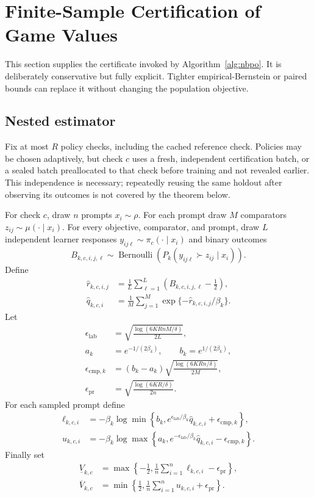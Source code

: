 \documentclass{article}
\theoremstyle{remark}
\theoremstyle{plain}
\begin{document}
\section{Finite-Sample Certification of Game Values}
\label{app:certificate}
This section supplies the certificate invoked by Algorithm~\ref{alg:nbpo}. It is deliberately conservative but fully explicit. Tighter empirical-Bernstein or paired bounds can replace it without changing the population objective.

\subsection{Nested estimator}
Fix at most $R$ policy checks, including the cached reference check. Policies may be chosen adaptively, but check $c$ uses a fresh, independent certification batch, or a sealed batch preallocated to that check before training and not revealed earlier. This independence is necessary; repeatedly reusing the same holdout after observing its outcomes is not covered by the theorem below.

For check $c$, draw $n$ prompts $x_i\sim\rho$. For each prompt draw $M$ comparators $z_{ij}\sim\mu(\cdot\mid x_i)$. For every objective, comparator, and prompt, draw $L$ independent learner responses $y_{ij\ell}\sim\pi_c(\cdot\mid x_i)$ and binary outcomes
\[
B_{k,c,i,j,\ell}\sim\operatorname{Bernoulli}
(P_k(y_{ij\ell}\succ z_{ij}\mid x_i)).
\]
Define
\begin{align}
\widehat r_{k,c,i,j}
&=\frac1L\sum_{\ell=1}^L
\left(B_{k,c,i,j,\ell}-\tfrac12\right),
\label{eq:cert-rhat}\\
\widehat q_{k,c,i}
&=\frac1M\sum_{j=1}^M
\exp\{-\widehat r_{k,c,i,j}/\beta_k\}.
\label{eq:cert-qhat}
\end{align}
Let
\begin{align}
\epsilon_{\mathrm{lab}}
&=\sqrt{\frac{\log(6KRnM/\delta)}{2L}},
\label{eq:eps-label}\\
a_k&=e^{-1/(2\beta_k)},
\qquad b_k=e^{1/(2\beta_k)},
\label{eq:ab-def}\\
\epsilon_{\mathrm{cmp},k}
&=(b_k-a_k)
\sqrt{\frac{\log(6KRn/\delta)}{2M}},
\label{eq:eps-comparator}\\
\epsilon_{\mathrm{pr}}
&=\sqrt{\frac{\log(6KR/\delta)}{2n}}.
\label{eq:eps-prompt}
\end{align}
For each sampled prompt define
\begin{align}
\ell_{k,c,i}
&=-\beta_k\log\min\left\{
 b_k,
 e^{\epsilon_{\mathrm{lab}}/\beta_k}\widehat q_{k,c,i}
 +\epsilon_{\mathrm{cmp},k}
\right\},
\label{eq:perprompt-lower}\\
u_{k,c,i}
&=-\beta_k\log\max\left\{
 a_k,
 e^{-\epsilon_{\mathrm{lab}}/\beta_k}\widehat q_{k,c,i}
 -\epsilon_{\mathrm{cmp},k}
\right\}.
\label{eq:perprompt-upper}
\end{align}
Finally set
\begin{align}
\underline V_{k,c}
&=\max\left\{-\tfrac12,
\frac1n\sum_{i=1}^n\ell_{k,c,i}-\epsilon_{\mathrm{pr}}
\right\},
\label{eq:V-lower}\\
\overline V_{k,c}
&=\min\left\{\tfrac12,
\frac1n\sum_{i=1}^n u_{k,c,i}+\epsilon_{\mathrm{pr}}
\right\}.
\label{eq:V-upper}
\end{align}
\end{document}
